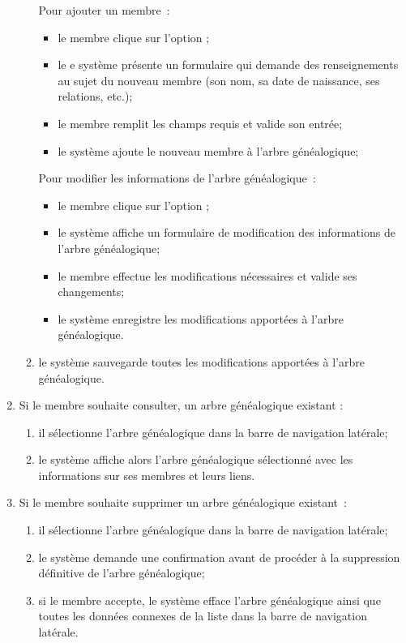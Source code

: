 \begin{enumerate}
\begin{enumerate}
        \subitem Pour ajouter un membre :

          \begin{itemize}
            \item le membre clique sur l’option ;
            \item le e système présente un formulaire qui demande des
              renseignements au sujet du nouveau membre (son nom, sa date de
              naissance, ses relations, etc.);
            \item le membre remplit les champs requis et valide son entrée;
            \item le système ajoute le nouveau membre à l’arbre généalogique;
          \end{itemize}

        \subitem Pour modifier les informations de l’arbre généalogique :

          \begin{itemize}
            \item le membre clique sur l’option ;
            \item le système affiche un formulaire de modification des informations de l’arbre généalogique;
            \item le membre effectue les modifications nécessaires et valide ses changements;
            \item le système enregistre les modifications apportées à l’arbre généalogique.
          \end{itemize}

      \item le système sauvegarde toutes les modifications apportées à l’arbre généalogique.
    \end{enumerate}

  \item Si le membre souhaite consulter, un arbre généalogique existant :
    \begin{enumerate}
      \item il sélectionne l’arbre généalogique dans la barre de navigation latérale;
      \item le système affiche alors l’arbre généalogique sélectionné avec les
        informations sur ses membres et leurs liens.
    \end{enumerate}

  \item Si le membre souhaite supprimer un arbre généalogique existant :
    \begin{enumerate}
      \item il sélectionne l’arbre généalogique dans la barre de navigation latérale;
      \item le système demande une confirmation avant de procéder à la
        suppression définitive de l’arbre généalogique;
      \item si le membre accepte, le système efface l’arbre généalogique
        ainsi que toutes les données connexes de la liste dans la barre de
        navigation latérale.
    \end{enumerate}

\end{enumerate}

